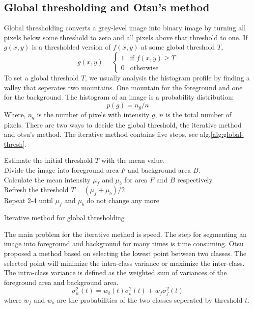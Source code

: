 \documentclass[b5,12pt]{report}
\begin{document}
\subsection{Global thresholding and Otsu's method}
Global thresholding converts a grey-level image into binary image by turning all pixels below some threshold to zero and all pixels above that threshold to one. If $g(x,y)$ is a thresholded version of $f(x,y)$ at some global threshold $T$, 
$$
g(x,y) = \left\{
  \begin{array}{ll}
  1 & \mbox{if } f(x,y) \ge T \\
  0 & \mbox{otherwise}
  \end{array}
  \right.
$$
To set a global threshold $T$, we usually analysis the histogram profile by finding a valley that seperates two mountains. One mountain for the foreground and one for the background. The histogram of an image is a probability distribution:
$$
p(g) = n_g/n
$$
Where, $n_g$ is the number of pixels with intensity $g$, $n$ is the total number of pixels. There are two ways to decide the global threshold, the iterative method and otsu's method. The iterative method contains five steps, see alg.\ref{alg:global-thresh}.\\
\begin{algorithm}
\SetAlgoLined
{}
Estimate the initial threshold $T$ with the mean value.\\
Divide the image into foreground area $F$ and background area $B$.\\
Calculate the mean intensity $\mu_f$ and $\mu_b$ for area $F$ and $B$ respectively.\\
Refresh the threshold $T = (\mu_f + \mu_b)/2$\\
Repeat 2-4 until $\mu_f$ and $\mu_b$ do not change any more
\caption{Iterative method for global thresholding}
\label{alg:global-thresh}
\end{algorithm}
The main problem for the iterative method is speed. The step for segmenting an image into foreground and background for many times is time consuming. Otsu \cite{otsu1975threshold} proposed a method based on selecting the lowest point between two classes. The selected point will minimize the intra-class variance or maximize the inter-class. The intra-class variance is defined as the weighted sum of variances of the foreground area and background area.\\
$$
\sigma_w^2(t) = w_b(t)\sigma_b^2(t) + w_f\sigma_f^2(t)
$$
where $w_f$ and $w_b$ are the probabilities of the two classes seperated by threshold $t$.
\end{document}
